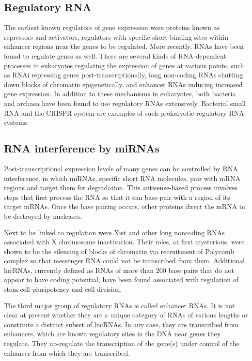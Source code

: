 \hypertarget{regulatory-rna}{%
\subsection{Regulatory RNA}\label{regulatory-rna}}

The earliest known regulators of gene expression were proteins known as repressors and activators, regulators with specific short binding sites within enhancer regions near the genes to be regulated. More recently, RNAs have been found to regulate genes as well. There are several kinds of RNA-dependent processes in eukaryotes regulating the expression of genes at various points, such as RNAi repressing genes post-transcriptionally, long non-coding RNAs shutting down blocks of chromatin epigenetically, and enhancer RNAs inducing increased gene expression. In addition to these mechanisms in eukaryotes, both bacteria and archaea have been found to use regulatory RNAs extensively. Bacterial small RNA and the CRISPR system are examples of such prokaryotic regulatory RNA systems.

\hypertarget{rna-interference-by-mirnas}{%
\subsection{RNA interference by miRNAs}\label{rna-interference-by-mirnas}}

Post-transcriptional expression levels of many genes can be controlled by RNA interference, in which miRNAs, specific short RNA molecules, pair with mRNA regions and target them for degradation. This antisense-based process involves steps that first process the RNA so that it can base-pair with a region of its target mRNAs. Once the base pairing occurs, other proteins direct the mRNA to be destroyed by nucleases.

Next to be linked to regulation were Xist and other long noncoding RNAs associated with X chromosome inactivation. Their roles, at first mysterious, were shown to be the silencing of blocks of chromatin via recruitment of Polycomb complex so that messenger RNA could not be transcribed from them. Additional lncRNAs, currently defined as RNAs of more than 200 base pairs that do not appear to have coding potential, have been found associated with regulation of stem cell pluripotency and cell division.

The third major group of regulatory RNAs is called enhancer RNAs. It is not clear at present whether they are a unique category of RNAs of various lengths or constitute a distinct subset of lncRNAs. In any case, they are transcribed from enhancers, which are known regulatory sites in the DNA near genes they regulate. They up-regulate the transcription of the gene(s) under control of the enhancer from which they are transcribed.

